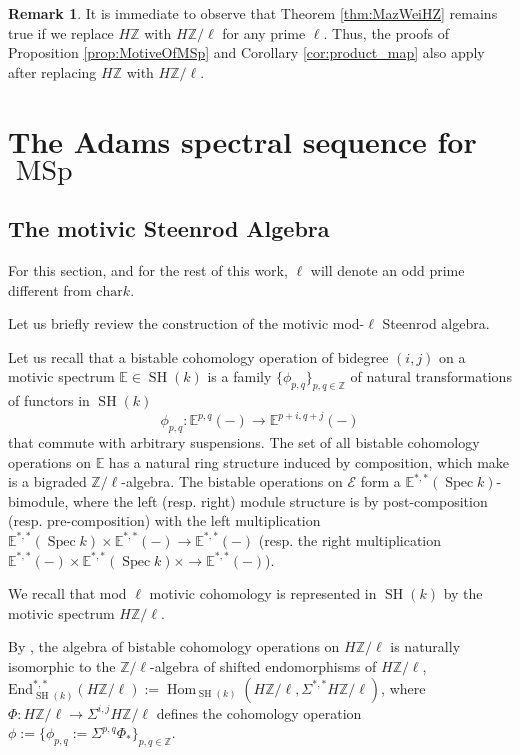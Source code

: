 \documentclass[10pt]{amsart}
\theoremstyle{definition}
\newtheorem{rmk}[defn]{Remark}
\theoremstyle{plain}
\numberwithin{equation}{section}
\newcommand{\0}{\emptyset}
\newcommand{\sE}{{\mathcal E}}
\newcommand{\E}{{\mathbb E}}
\newcommand{\Z}{{\mathbb Z}}
\newcommand{\MSp}{{\operatorname{MSp}}}
\newcommand{\Spec}{{\operatorname{Spec}}}
\newcommand{\SH}{{\operatorname{SH}}}
\newcommand{\Hom}{{\operatorname{Hom}}}
\begin{document}
\begin{rmk}
\label{rmk:HZ/ell}
    It is immediate to observe that Theorem \ref{thm:MazWeiHZ} remains true if we replace $H\Z$ with $H\Z/\ell$ for any prime $\ell$. Thus, the proofs of Proposition \ref{prop:MotiveOfMSp} and Corollary \ref{cor:product_map} also apply after replacing $H\Z$ with $H\Z/\ell.$
\end{rmk}

\section{The Adams spectral sequence for $\MSp$}
\label{chapter:A.S.S}

\subsection{The motivic Steenrod Algebra}

For this section, and for the rest of this work, $\ell$ will denote an odd prime different from $\text{char} k$.

Let us briefly review the construction of the motivic mod-$\ell$ Steenrod algebra.

Let us recall that a bistable cohomology operation of bidegree $(i,j)$ on a motivic spectrum $\E \in \SH(k)$ is a family $\{\phi_{p,q}\}_{p,q \in \Z}$ of natural transformations of functors in $\SH(k)$
$$\phi_{p,q}:\E^{p,q}(-) \to \E^{p+i,q+j}(-)$$
that commute with arbitrary suspensions. The set of all bistable cohomology operations on $\E$ has a natural ring structure induced by composition, which make is a bigraded $\Z/\ell$-algebra. The bistable operations on $\sE$ form a 
$\E^{*,*}(\Spec k)$-bimodule, where the left (resp. right) module structure is by post-composition (resp. pre-composition) with the left multiplication $\E^{*,*}(\Spec k)\times \E^{*,*}(-)\to
\E^{*,*}(-)$ (resp. the right multiplication $\E^{*,*}(-)\times \E^{*,*}(\Spec k)\times \to
\E^{*,*}(-)$).

We recall that mod $\ell$ motivic cohomology is represented in $\SH(k)$ by the motivic spectrum $H\Z/\ell$.

By \cite[Theorem 1.1]{Hoy:Steenrod}, the algebra of bistable cohomology operations on $H\Z/\ell$ is naturally isomorphic to the $\Z/\ell$-algebra of shifted endomorphisms of $H\Z/\ell$, $\text{End}_{\SH(k)}^{*,*}(H\Z/\ell):=\Hom_{\SH(k)}(H\Z/\ell,\Sigma^{*,*}H\Z/\ell)$, where $\Phi:H\Z/\ell\to \Sigma^{i,j}H\Z/\ell$ defines the cohomology operation $\phi:=\{\phi_{p,q}:=\Sigma^{p,q}\Phi_*\}_{p,q\in\Z}$.
\end{document}
